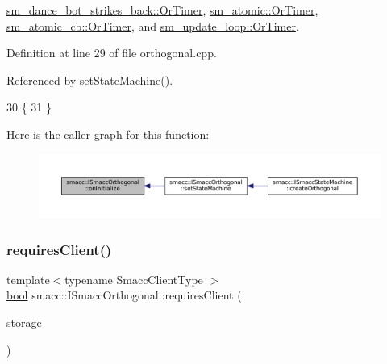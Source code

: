 \hyperlink{classsm__dance__bot__strikes__back_1_1OrTimer_a89c7a3040c7d44d877d8b85b89883cb1}{sm\+\_\+dance\+\_\+bot\+\_\+strikes\+\_\+back\+::\+Or\+Timer}, \hyperlink{classsm__atomic_1_1OrTimer_a509b0d9ce7c6ed9e0c291decaf6dd280}{sm\+\_\+atomic\+::\+Or\+Timer}, \hyperlink{classsm__atomic__cb_1_1OrTimer_a0d010997d6304786b2b91ae3f32fa978}{sm\+\_\+atomic\+\_\+cb\+::\+Or\+Timer}, and \hyperlink{classsm__update__loop_1_1OrTimer_af2b4637bc236bcaada12b703c5f0a110}{sm\+\_\+update\+\_\+loop\+::\+Or\+Timer}.



Definition at line 29 of file orthogonal.\+cpp.



Referenced by set\+State\+Machine().


\begin{DoxyCode}
30   \{
31   \}
\end{DoxyCode}
Here is the caller graph for this function\+:
\nopagebreak
\begin{figure}[H]
\begin{center}
\leavevmode
\includegraphics[width=350pt]{classsmacc_1_1ISmaccOrthogonal_a6bb31c620cb64dd7b8417f8705c79c7a_icgraph}
\end{center}
\end{figure}
\mbox{\label{classsmacc_1_1ISmaccOrthogonal_a602e16b09f8a1b3de889f2f3d90a3211}} 
\subsubsection{\texorpdfstring{requires\+Client()}{requiresClient()}}
{\footnotesize\ttfamily template$<$typename Smacc\+Client\+Type $>$ \\
\hyperlink{classbool}{bool} smacc\+::\+I\+Smacc\+Orthogonal\+::requires\+Client (\begin{DoxyParamCaption}\item[{Smacc\+Client\+Type $\ast$\&}]{storage }\end{DoxyParamCaption})}



